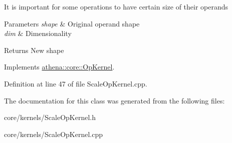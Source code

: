 It is important for some operations to have certain size of their operands 
\begin{DoxyParams}{Parameters}
{\em shape} & Original operand shape \\
\hline
{\em dim} & Dimensionality \\
\hline
\end{DoxyParams}
\begin{DoxyReturn}{Returns}
New shape 
\end{DoxyReturn}


Implements \mbox{\hyperlink{classathena_1_1core_1_1_op_kernel_a762e541463ffd089b47a8e6755c30fe1}{athena\+::core\+::\+Op\+Kernel}}.



Definition at line 47 of file Scale\+Op\+Kernel.\+cpp.



The documentation for this class was generated from the following files\+:\begin{DoxyCompactItemize}
\item 
core/kernels/Scale\+Op\+Kernel.\+h\item 
core/kernels/Scale\+Op\+Kernel.\+cpp\end{DoxyCompactItemize}
